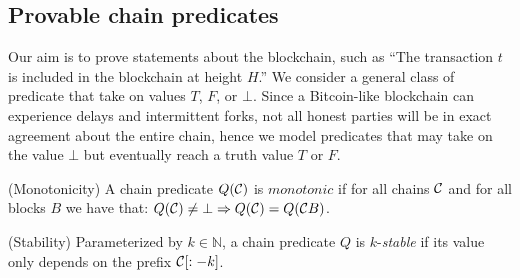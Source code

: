 \subsection{Provable chain predicates}

Our aim is to prove statements about the blockchain, such as ``The transaction $t$ is included in the blockchain at height $H$.'' We consider a general class of predicate that take on values $T$, $F$, or $\bot$. 
  Since a Bitcoin-like blockchain can experience delays and intermittent forks, not all honest parties will be in exact agreement about the entire chain, hence we model predicates that may take on the value $\bot$ but eventually reach a truth value $T$ or $F$.

\begin{definition}{(Monotonicity)}
    A chain predicate $Q(\mathcal{C})$ is $\textit{monotonic}$ if for all chains
    $\mathcal{C}$ and for all blocks $B$ we have that:
    $Q(\mathcal{C}) \neq \bot \Rightarrow Q(\mathcal{C}) = Q(\mathcal{C} B)$.
\end{definition}

\begin{definition}{(Stability)}
    Parameterized by $k \in \mathbb{N}$, a chain predicate
    $Q$ is $k$-\textit{stable} if its value only depends on the prefix $\mathcal{C}[:-k]$.

\end{definition}
%

